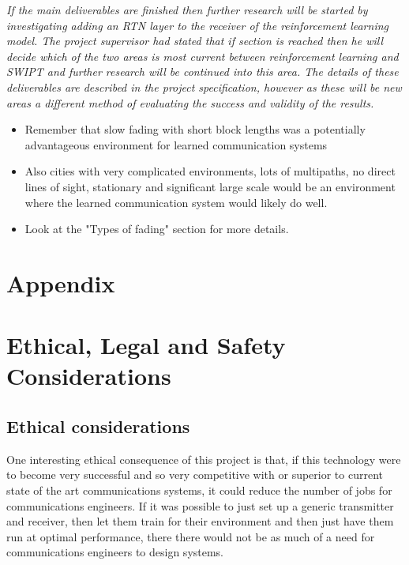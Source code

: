\documentclass[12pt,onecolumn,letterpaper]{article}
\begin{document}
\textit{
If the main deliverables are finished then further research will be started by investigating adding an RTN layer to the receiver of the reinforcement learning model. The project supervisor had stated that
if section is reached then he will decide which of the two areas is most current between reinforcement learning and SWIPT and further research will be continued into this area. The details of these deliverables are described in the project specification, however as these will be new areas a different method of evaluating the success and validity of the results.
}

\begin{itemize}
   \item Remember that slow fading with short block lengths was a potentially advantageous environment for learned communication systems
   \item Also cities with very complicated environments, lots of multipaths, no direct lines of sight, stationary and significant large scale would be an environment where the learned communication system would likely do well.
   \item Look at the "Types of fading" section for more details.
\end{itemize}


\FloatBarrier
\appendix
\section{Appendix}

\section{Ethical, Legal and Safety Considerations}

\subsection{Ethical considerations}

One interesting ethical consequence of this project is that, if this technology were to become very successful and so very competitive with or superior to current state of the art communications systems, it could reduce the number of jobs for communications engineers. If it was possible to just set up a generic transmitter and receiver, then let them train for their environment and then just have them run at optimal performance, there there would not be as much of a need for communications engineers to design systems.
\end{document}
